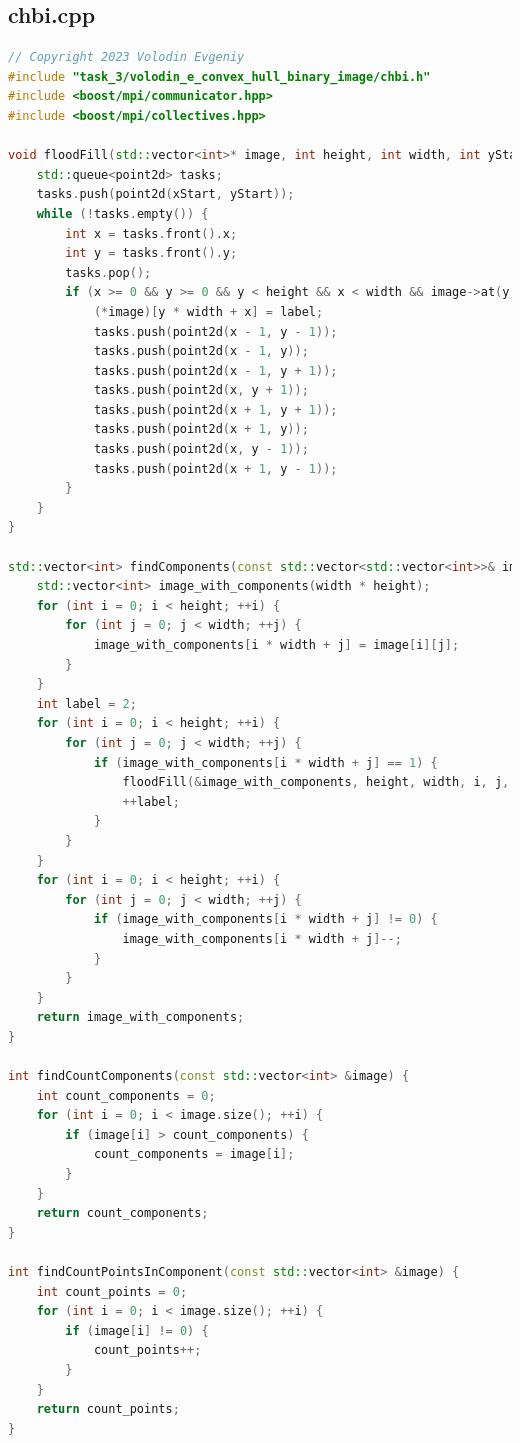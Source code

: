 \documentclass[a4paper, 12pt]{extarticle}
\begin{document}
\subsection*{chbi.cpp}
	\begin{lstlisting}[language=C++]
// Copyright 2023 Volodin Evgeniy
#include "task_3/volodin_e_convex_hull_binary_image/chbi.h"
#include <boost/mpi/communicator.hpp>
#include <boost/mpi/collectives.hpp>

void floodFill(std::vector<int>* image, int height, int width, int yStart, int xStart, int label) {
	std::queue<point2d> tasks;
	tasks.push(point2d(xStart, yStart));
	while (!tasks.empty()) {
		int x = tasks.front().x;
		int y = tasks.front().y;
		tasks.pop();
		if (x >= 0 && y >= 0 && y < height && x < width && image->at(y * width + x) == 1) {
			(*image)[y * width + x] = label;
			tasks.push(point2d(x - 1, y - 1));
			tasks.push(point2d(x - 1, y));
			tasks.push(point2d(x - 1, y + 1));
			tasks.push(point2d(x, y + 1));
			tasks.push(point2d(x + 1, y + 1));
			tasks.push(point2d(x + 1, y));
			tasks.push(point2d(x, y - 1));
			tasks.push(point2d(x + 1, y - 1));
		}
	}
}

std::vector<int> findComponents(const std::vector<std::vector<int>>& image, int width, int height) {
	std::vector<int> image_with_components(width * height);
	for (int i = 0; i < height; ++i) {
		for (int j = 0; j < width; ++j) {
			image_with_components[i * width + j] = image[i][j];
		}
	}
	int label = 2;
	for (int i = 0; i < height; ++i) {
		for (int j = 0; j < width; ++j) {
			if (image_with_components[i * width + j] == 1) {
				floodFill(&image_with_components, height, width, i, j, label);
				++label;
			}
		}
	}
	for (int i = 0; i < height; ++i) {
		for (int j = 0; j < width; ++j) {
			if (image_with_components[i * width + j] != 0) {
				image_with_components[i * width + j]--;
			}
		}
	}
	return image_with_components;
}

int findCountComponents(const std::vector<int> &image) {
	int count_components = 0;
	for (int i = 0; i < image.size(); ++i) {
		if (image[i] > count_components) {
			count_components = image[i];
		}
	}
	return count_components;
}

int findCountPointsInComponent(const std::vector<int> &image) {
	int count_points = 0;
	for (int i = 0; i < image.size(); ++i) {
		if (image[i] != 0) {
			count_points++;
		}
	}
	return count_points;
}


\end{lstlisting}
\end{document}
